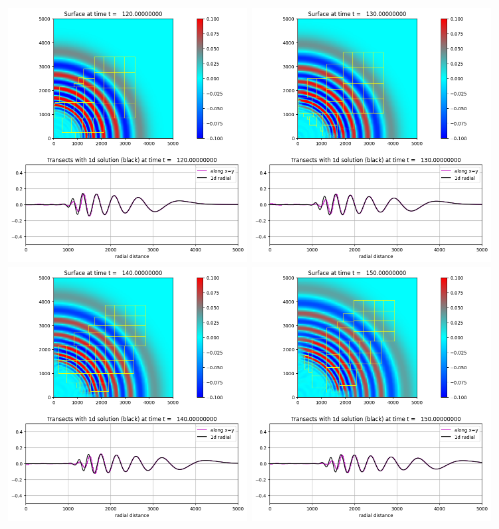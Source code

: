 \documentclass[11pt]{article}
\begin{document}
\vskip 10pt 
\includegraphics[width=0.475\textwidth]{frame0012fig20.png}
\vskip 10pt 
\includegraphics[width=0.475\textwidth]{frame0013fig20.png}
\vskip 10pt 
\includegraphics[width=0.475\textwidth]{frame0014fig20.png}
\vskip 10pt 
\includegraphics[width=0.475\textwidth]{frame0015fig20.png}
\end{document}
